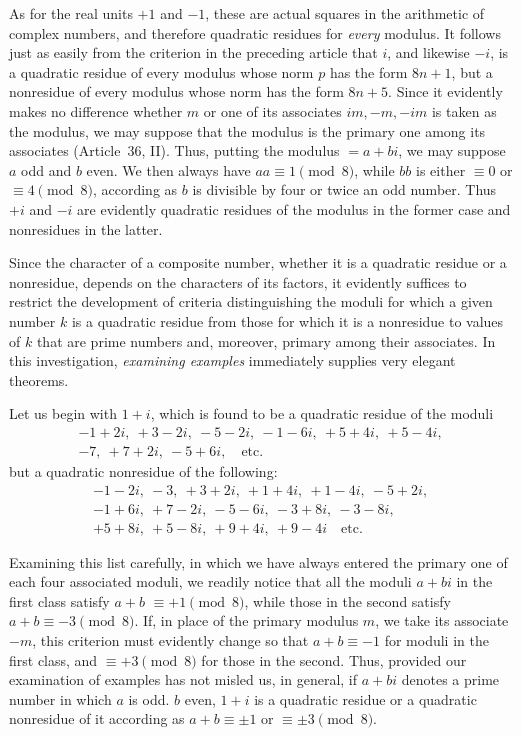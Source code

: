 As for the real units $+1$ and $-1$, these are actual squares in the arithmetic of complex numbers, and therefore quadratic residues for \emph{every} modulus. It follows just as easily from the criterion in the preceding article that $i$, and likewise $-i$, is a quadratic residue of every modulus whose norm $p$ has the form $8n+1$, but a nonresidue of every modulus whose norm has the form $8n+5$. Since it evidently makes no difference whether $m$ or one of its associates $im,-m,-im$ is taken as the modulus, we may suppose that the modulus is the primary one among its associates (Article~36, II). Thus, putting the modulus $=a+bi$, we may suppose $a$ odd and $b$ even. We then always have $aa\equiv1\pmod8$, while $bb$ is either $\equiv0$ or $\equiv4\pmod8$, according as $b$ is divisible by four or twice an odd number. Thus $+i$ and $-i$ are evidently quadratic residues of the modulus in the former case and nonresidues in the latter.

%
Since the character of a composite number, whether it is a quadratic residue or a nonresidue, depends on the characters of its factors, it evidently suffices to restrict the development of criteria distinguishing the moduli for which a given number $k$ is a quadratic residue from those for which it is a nonresidue to values of $k$ that are prime numbers and, moreover, primary among their associates. In this investigation, \emph{examining examples} immediately supplies very elegant theorems.

Let us begin with $1+i$, which is found to be a quadratic residue of the moduli
\[
\begin{gathered}
-1+2i,\ +3-2i,\ -5-2i,\ -1-6i,\ +5+4i,\ +5-4i,\\
-7,\ +7+2i,\ -5+6i,\quad\text{etc.}
\end{gathered}
\]
but a quadratic nonresidue of the following:
\[
\begin{gathered}
-1-2i,\ -3,\ +3+2i,\ +1+4i,\ +1-4i,\ -5+2i,\\
-1+6i,\ +7-2i,\ -5-6i,\ -3+8i,\ -3-8i,\\
+5+8i,\ +5-8i,\ +9+4i,\ +9-4i\quad\text{etc.}
\end{gathered}
\]

Examining this list carefully, in which we have always entered the primary one of each four associated moduli, we readily notice that all the moduli $a+bi$ in the first class satisfy $a+b$ $\equiv+1\pmod8$, while those in the second satisfy $a+b\equiv-3\pmod8$. If, in place of the primary modulus $m$, we take its associate $-m$, this criterion must evidently change so that $a+b\equiv-1$ for moduli in the first class, and $\equiv+3\pmod8$ for those in the second. Thus, provided our examination of examples has not misled us, in general, if $a+bi$ denotes a prime number in which $a$ is odd. $b$ even, $1+i$ is a quadratic residue or a quadratic nonresidue of it according as $a+b\equiv\pm1$ or $\equiv\pm3\pmod8$.


